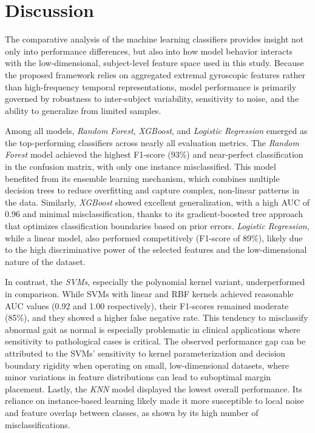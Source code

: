 \section{Discussion}
\label{sec:discussion}

The comparative analysis of the machine learning classifiers provides insight not only into performance differences, but also into how model behavior interacts 
with the low-dimensional, subject-level feature space used in this study. Because the proposed framework relies on aggregated extremal gyroscopic features 
rather than high-frequency temporal representations, model performance is primarily governed by robustness to inter-subject variability, sensitivity to noise, 
and the ability to generalize from limited samples.

Among all models, \textit{Random Forest}, \textit{XGBoost}, and \textit{Logistic Regression} emerged as the top-performing classifiers across nearly all evaluation 
metrics. The \textit{Random Forest} model achieved the highest F1-score (93\%) and near-perfect classification in the confusion matrix, with only one instance 
misclassified. This model benefited from its ensemble learning mechanism, which combines multiple decision trees to reduce overfitting and capture complex, 
non-linear patterns in the data. Similarly, \textit{XGBoost} showed excellent generalization, with a high AUC of 0.96 and minimal misclassification, thanks to 
its gradient-boosted tree approach that optimizes classification boundaries based on prior errors. \textit{Logistic Regression}, while a linear model, also 
performed competitively (F1-score of 89\%), likely due to the high discriminative power of the selected features and the low-dimensional nature of the dataset.

In contrast, the \textit{SVMs}, especially the polynomial kernel variant, underperformed in comparison. While SVMs 
with linear and RBF kernels achieved reasonable AUC values (0.92 and 1.00 respectively), their F1-scores remained moderate (85\%), and they showed a higher 
false negative rate. This tendency to misclassify abnormal gait as normal is especially problematic in clinical applications where sensitivity to pathological cases 
is critical. The observed performance gap can be attributed to the SVMs’ sensitivity to kernel parameterization and decision boundary rigidity when operating on small, 
low-dimensional datasets, where minor variations in feature distributions can lead to suboptimal margin placement. Lastly, the \textit{KNN} model displayed the 
lowest overall performance. Its reliance on instance-based learning likely made it more susceptible to local noise and feature overlap between classes, as shown by 
its high number of misclassifications.

